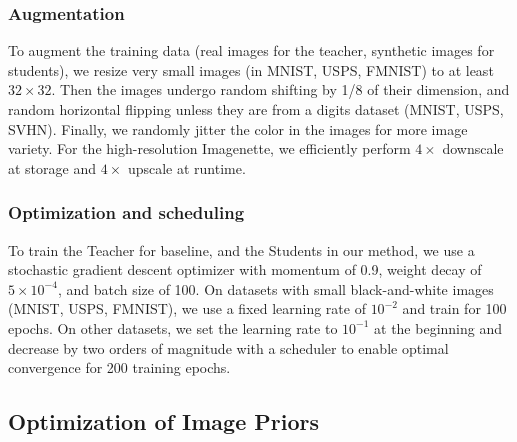 \subsubsection{Augmentation} \label{sssec:app01-teacherstudents-augment}
\begin{foldable} %
    To augment the training data (real images for the teacher, synthetic images for students), we resize very small images (in MNIST, USPS, FMNIST) to at least $32\times32$.
    Then the images undergo random shifting by 1/8 of their dimension, and random horizontal flipping unless they are from a digits dataset (MNIST, USPS, SVHN).
    Finally, we randomly jitter the color in the images for more image variety.
    For the high-resolution Imagenette, we efficiently perform $4\times$ downscale at storage and $4\times$ upscale at runtime.
\end{foldable}

\subsubsection{Optimization and scheduling} \label{sssec:app01-teacherstudents-optimization}
\begin{foldable} %
    To train the Teacher for baseline, and the Students in our method, we use a stochastic gradient descent optimizer with momentum of 0.9, weight decay of $5\times10^{-4}$, and batch size of 100.
    On datasets with small black-and-white images (MNIST, USPS, FMNIST), we use a fixed learning rate of $10^{-2}$ and train for 100 epochs.
    On other datasets, we set the learning rate to $10^{-1}$ at the beginning and decrease by two orders of magnitude with a scheduler to enable optimal convergence for 200 training epochs.
\end{foldable}


\subsection{Optimization of Image Priors} \label{ssec:app01-imagepriors}
